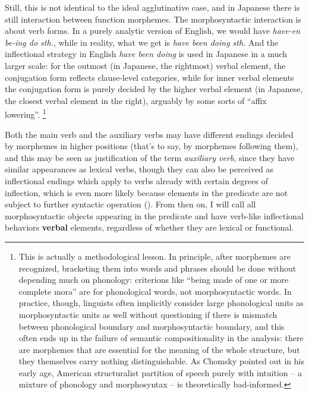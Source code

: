 \documentclass[UTF8, a4paper, oneside, scheme=plain]{ctexart}
\newcommand*{\concept}[1]{\textbf{#1}}
\newcommand*{\term}[1]{\emph{#1}}
\newcommand{\corpus}[1]{\emph{#1}}
\begin{document}
Still, this is not identical to the ideal agglutinative case,
and in Japanese there is still interaction between function morphemes.
The morphosyntactic interaction is about verb forms.
In a purely analytic version of English,
we would have \corpus{have-en be-ing do sth.},
while in reality, what we get is \corpus{have been doing sth.}
And the inflectional strategy in English \corpus{have been doing} 
is used in Japanese in a much larger scale:
for the outmost (in Japanese, the rightmost) verbal element,
the conjugation form reflects clause-level categories,
while for inner verbal elements the conjugation form is purely decided 
by the higher verbal element (in Japanese, the closest verbal element in the right), 
arguably by some sorts of ``affix lowering''.%
\footnote{
    This is actually a methodological lesson.
    In principle, after morphemes are recognized,
    bracketing them into words and phrases should be done
    without depending much on phonology:
    criterions like ``being made of one or more complete mora''
    are for phonological words, not morphosyntactic words.
    In practice, though, linguists often implicitly 
    consider large phonological units as morphosyntactic units as well 
    without questioning if there is mismatch between phonological boundary and morphosyntactic boundary,
    and this often ends up in the failure of semantic compositionality in the analysis:
    there are morphemes that are essential for the meaning of the whole structure,
    but they themselves carry nothing distinguishable.
    As Chomsky pointed out in his early age,
    American structuralist partition of speech purely with intuition 
    -- a mixture of phonology and morphosyntax --
    is theoretically bad-informed.
}

Both the main verb and the auxiliary verbs may have different endings 
decided by morphemes in higher positions (that's to say, by morphemes following them),
and this may be seen as justification of the term \term{auxiliary verb},
since they have similar appearances as lexical verbs,
though they can also be perceived as inflectional endings 
which apply to verbs already with certain degrees of inflection,
which is even more likely because elements in the predicate are not subject to further syntactic operation
().
From then on, I will call all morphosyntactic objects 
appearing in the predicate and have verb-like inflectional behaviors \concept{verbal} elements,
regardless of whether they are lexical or functional.
\end{document}
